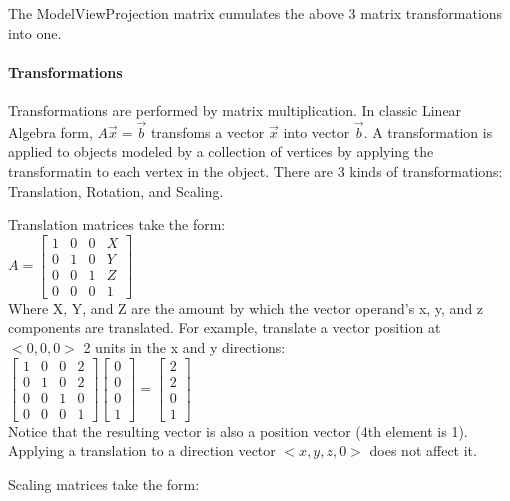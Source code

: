 \documentclass[12pt]{article}
\begin{document}
The ModelViewProjection matrix cumulates the above 3 matrix transformations into
one.

\paragraph{Transformations} Transformations are performed by matrix multiplication.
In classic Linear Algebra form, $A\vec{x} = \vec{b}$ transfoms a vector $\vec{x}$ into 
vector $\vec{b}$. A transformation is applied to objects modeled by a collection of 
vertices by applying the transformatin to each vertex in the object.
There are 3 kinds of transformations: Translation, Rotation, and Scaling.

Translation matrices take the form: \\

$ A = \begin{bmatrix}
1 & 0 & 0 & X \\
0 & 1 & 0 & Y \\
0 & 0 & 1 & Z \\
0 & 0 & 0 & 1
\end{bmatrix}$ \\

Where X, Y, and Z are the amount by which the vector operand's x, y, and z 
components are translated. For example, translate a vector position at
$<0,0,0>$ 2 units in the x and y directions: \\

$
\begin{bmatrix} 1 & 0 & 0 & 2 \\ 0 & 1 & 0 & 2 \\ 0 & 0 & 1 & 0 \\ 0 & 0 & 0 & 1
\end{bmatrix}\begin{bmatrix} 0 \\ 0 \\ 0 \\ 1 \end{bmatrix} = 
\begin{bmatrix} 2 \\ 2 \\ 0 \\ 1 \end{bmatrix}
$ \\

Notice that the resulting vector is also a position vector (4th element is 1).
Applying a translation to a direction vector $<x,y,z,0>$ does not
affect it. 

Scaling matrices take the form: \\
\end{document}
